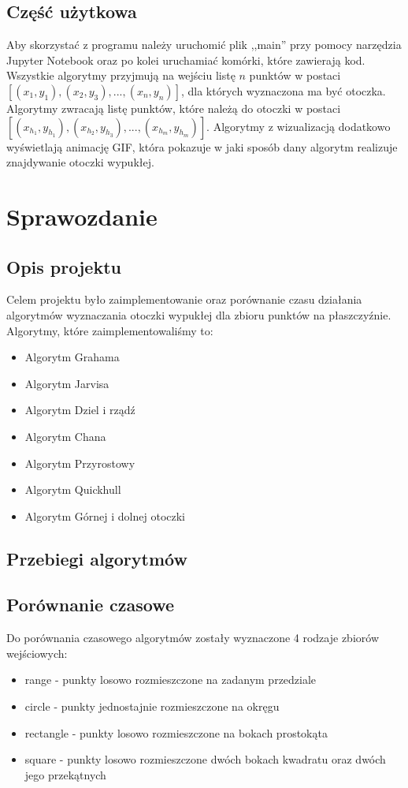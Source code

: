 \documentclass[a4paper,11pt]{article}
\begin{document}
\subsection{Część użytkowa}
Aby skorzystać z programu należy uruchomić plik ,,main'' przy pomocy narzędzia Jupyter Notebook oraz po kolei uruchamiać komórki, które zawierają kod. Wszystkie algorytmy przyjmują na wejściu listę $n$ punktów w postaci $[(x_1, y_1), (x_2, y_3), ..., (x_n, y_n)]$, dla których wyznaczona ma być otoczka. Algorytmy zwracają listę punktów, które należą do otoczki w postaci $[(x_{h_1}, y_{h_1}), (x_{h_2}, y_{h_3}), ..., (x_{h_m}, y_{h_m})]$. Algorytmy z wizualizacją dodatkowo wyświetlają animację GIF, która pokazuje w jaki sposób dany algorytm realizuje znajdywanie otoczki wypukłej.

\section{Sprawozdanie}
\subsection{Opis projektu}
Celem projektu było zaimplementowanie oraz porównanie czasu działania algorytmów wyznaczania otoczki wypukłej dla zbioru punktów na płaszczyźnie. Algorytmy, które zaimplementowaliśmy to:
\begin{itemize}
\item Algorytm Grahama
\item Algorytm Jarvisa
\item Algorytm Dziel i rządź
\item Algorytm Chana
\item Algorytm Przyrostowy
\item Algorytm Quickhull
\item Algorytm Górnej i dolnej otoczki
\end{itemize}

\subsection{Przebiegi algorytmów}

\subsection{Porównanie czasowe}
Do porównania czasowego algorytmów zostały wyznaczone 4 rodzaje zbiorów wejściowych:
\begin{itemize}
\item range - punkty losowo rozmieszczone na zadanym przedziale
\item circle - punkty jednostajnie rozmieszczone na okręgu
\item rectangle - punkty losowo rozmieszczone na bokach prostokąta
\item square - punkty losowo rozmieszczone dwóch bokach kwadratu oraz dwóch jego przekątnych
\end{itemize}
\end{document}
